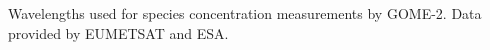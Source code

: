 \label{fig:gomeproducts}

Wavelengths used for species concentration measurements by GOME-2. Data provided by EUMETSAT and ESA.
